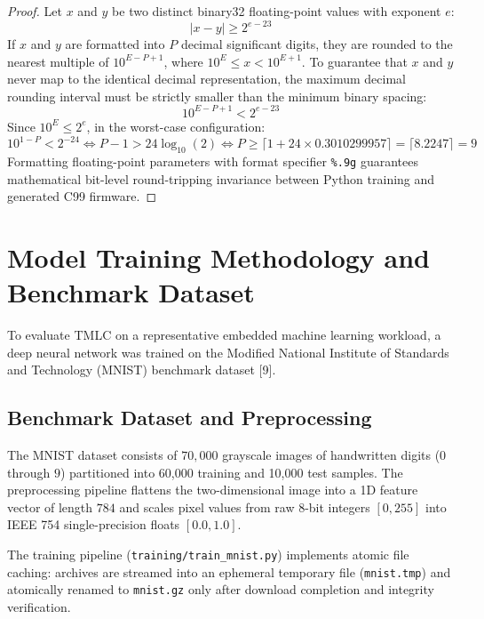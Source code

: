\documentclass[11pt,a4paper]{article}
\begin{document}
\begin{proof}
Let $x$ and $y$ be two distinct binary32 floating-point values with exponent $e$:
\begin{equation}
|x - y| \ge 2^{e - 23}
\end{equation}
If $x$ and $y$ are formatted into $P$ decimal significant digits, they are rounded to the nearest multiple of $10^{E - P + 1}$, where $10^E \le x < 10^{E+1}$. To guarantee that $x$ and $y$ never map to the identical decimal representation, the maximum decimal rounding interval must be strictly smaller than the minimum binary spacing:
\begin{equation}
10^{E - P + 1} < 2^{e - 23}
\end{equation}
Since $10^E \le 2^e$, in the worst-case configuration:
\begin{equation}
10^{1 - P} < 2^{-24} \iff P - 1 > 24 \log_{10}(2) \iff P \ge \lceil 1 + 24 \times 0.3010299957 \rceil = \lceil 8.2247 \rceil = 9
\end{equation}
Formatting floating-point parameters with format specifier \texttt{\%.9g} guarantees mathematical bit-level round-tripping invariance between Python training and generated C99 firmware.
\end{proof}

\section{Model Training Methodology and Benchmark Dataset}
\label{sec:training}

To evaluate TMLC on a representative embedded machine learning workload, a deep neural network was trained on the Modified National Institute of Standards and Technology (MNIST) benchmark dataset [9].

\subsection{Benchmark Dataset and Preprocessing}
The MNIST dataset consists of $70,000$ grayscale images of handwritten digits ($0$ through $9$) partitioned into 60,000 training and 10,000 test samples. The preprocessing pipeline flattens the two-dimensional image into a 1D feature vector of length $784$ and scales pixel values from raw 8-bit integers $[0, 255]$ into IEEE 754 single-precision floats $[0.0, 1.0]$.

The training pipeline (\texttt{training/train\_mnist.py}) implements atomic file caching: archives are streamed into an ephemeral temporary file (\texttt{mnist.tmp}) and atomically renamed to \texttt{mnist.gz} only after download completion and integrity verification.
\end{document}
